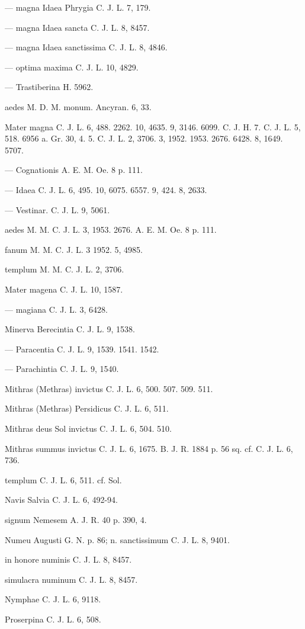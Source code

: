 \documentclass[a4paper, 11pt, oneside, polutonikogreek, german]{article}
\begin{document}
--- magna Idaea Phrygia C. J. L. 7, 179.

--- magna Idaea sancta C. J. L. 8, 8457.

--- magna Idaea sanctissima C. J. L. 8, 4846.

--- optima maxima C. J. L. 10, 4829.

--- Trastiberina H. 5962.

aedes M. D. M. monum. Ancyran. 6, 33.

Mater magna C. J. L. 6, 488. 2262. 10, 4635. 9, 3146. 6099. C. J. H. 7. C. J. L. 5, 518. 6956 a. Gr. 30, 4. 5. C. J. L. 2, 3706. 3, 1952. 1953. 2676. 6428. 8, 1649. 5707.

--- Cognationis A. E. M. Oe. 8 p. 111.

--- Idaea C. J. L. 6, 495. 10, 6075. 6557. 9, 424. 8, 2633.

--- Vestinar. C. J. L. 9, 5061.

aedes M. M. C. J. L. 3, 1953. 2676. A. E. M. Oe. 8 p. 111.

fanum M. M. C. J. L. 3 1952. 5, 4985.

templum M. M. C. J. L. 2, 3706.

Mater magena C. J. L. 10, 1587.

--- magiana C. J. L. 3, 6428.

Minerva Berecintia C. J. L. 9, 1538.

--- Paracentia C. J. L. 9, 1539. 1541. 1542.

--- Parachintia C. J. L. 9, 1540.

Mithras (Methras) invictus C. J. L. 6, 500. 507. 509. 511.

Mithras (Methras) Persidicus C. J. L. 6, 511.

Mithras deus Sol invictus C. J. L. 6, 504. 510.

Mithras summus invictus C. J. L. 6, 1675. B. J. R. 1884 p. 56 sq. cf. C. J. L. 6, 736.

templum C. J. L. 6, 511. cf. Sol.

Navis Salvia C. J. L. 6, 492-94.

signum Nemesem A. J. R. 40 p. 390, 4.

Numeu Augusti G. N. p. 86; n. sanctissimum C. J. L. 8, 9401.

in honore numinis C. J. L. 8, 8457.

simulacra numinum C. J. L. 8, 8457.

Nymphae C. J. L. 6, 9118.

Proserpina C. J. L. 6, 508.
\end{document}
